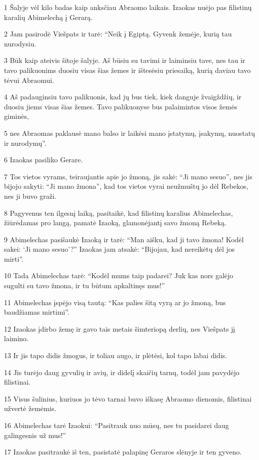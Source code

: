 \par 1 Šalyje vėl kilo badas kaip anksčiau Abraomo laikais. Izaokas nuėjo pas filistinų karalių Abimelechą į Gerarą. 
\par 2 Jam pasirodė Viešpats ir tarė: “Neik į Egiptą. Gyvenk žemėje, kurią tau nurodysiu. 
\par 3 Būk kaip ateivis šitoje šalyje. Aš būsiu su tavimi ir laiminsiu tave, nes tau ir tavo palikuonims duosiu visas šias žemes ir ištesėsiu priesaiką, kurią daviau tavo tėvui Abraomui. 
\par 4 Aš padauginsiu tavo palikuonis, kad jų bus tiek, kiek danguje žvaigždžių, ir duosiu jiems visas šias žemes. Tavo palikuonyse bus palaimintos visos žemės giminės, 
\par 5 nes Abraomas paklausė mano balso ir laikėsi mano įstatymų, įsakymų, nuostatų ir nurodymų”. 
\par 6 Izaokas pasiliko Gerare. 
\par 7 Tos vietos vyrams, teiraujantis apie jo žmoną, jis sakė: “Ji mano sesuo”, nes jis bijojo sakyti: “Ji mano žmona”, kad tos vietos vyrai neužmuštų jo dėl Rebekos, nes ji buvo graži. 
\par 8 Pagyvenus ten ilgesnį laiką, pasitaikė, kad filistinų karalius Abimelechas, žiūrėdamas pro langą, pamatė Izaoką, glamonėjantį savo žmoną Rebeką. 
\par 9 Abimelechas pasišaukė Izaoką ir tarė: “Man aišku, kad ji tavo žmona! Kodėl sakei: ‘Ji mano sesuo’?” Izaokas jam atsakė: “Bijojau, kad nereikėtų dėl jos mirti”. 
\par 10 Tada Abimelechas tarė: “Kodėl mums taip padarei? Juk kas nors galėjo sugulti su tavo žmona, ir tu būtum apkaltinęs mus!” 
\par 11 Abimelechas įspėjo visą tautą: “Kas palies šitą vyrą ar jo žmoną, bus baudžiamas mirtimi”. 
\par 12 Izaokas įdirbo žemę ir gavo tais metais šimteriopą derlių, nes Viešpats jį laimino. 
\par 13 Ir jis tapo didis žmogus, ir toliau augo, ir plėtėsi, kol tapo labai didis. 
\par 14 Jis turėjo daug gyvulių ir avių, ir didelį skaičių tarnų, todėl jam pavydėjo filistinai. 
\par 15 Visus šulinius, kuriuos jo tėvo tarnai buvo iškasę Abraomo dienomis, filistinai užvertė žemėmis. 
\par 16 Abimelechas tarė Izaokui: “Pasitrauk nuo mūsų, nes tu pasidarei daug galingesnis už mus!” 
\par 17 Izaokas pasitraukė iš ten, pasistatė palapinę Geraros slėnyje ir ten gyveno. 

